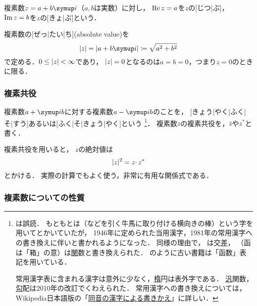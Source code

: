 \documentclass[../sotsu.tex]{subfiles}
\begin{document}
複素数$z = a + b\iu$（$a, b$は実数）に対し，
$\operatorname{Re} z = a$を$z$の[じつ|ぶ]，
$\operatorname{Im} z = b$を$z$の[きょ|ぶ]という．

複素数の[ぜっ|たい|ち](absolute value)を
\begin{equation}
    \label{eq:complex-number-abs}
    \abs{z} 
        = \abs{a + b\iu}
        \coloneq \sqrt{a^2 + b^2}
\end{equation}
で定める．$0 \leq \lvert z\rvert < \infty$であり，
$\lvert z\rvert = 0$となるのは$a = b = 0$，つまり$z = 0$のときに限る．



\subsubsection*{複素共役}

複素数$a + \iu b$に対する複素数$a - \iu b$のことを，
[きょう|やく|ふく|そ|すう]あるいは[ふく|そ|きょう|やく]という%
\footnote{\label{footnote:joyo-kanji}
    は誤読．
    もともとは（などを引く牛馬に取り付ける横向きの棒）という字を用いてとかいていたが，
    1946年に定められた当用漢字，1981年の常用漢字への書き換えに伴いと書かれるようになった．
    同様の理由で，
    は交\underline{差}，
    （函は「箱」の意）は\underline{関}数と書き換えられた．
    \cite{ito-lebesgue-1963}のように古い書籍は「函数」表記を用いている．
    
    常用漢字表に含まれる漢字は意外に少なく，\underline{楕}円は表外字である．
    \underline{汎}関数，\underline{勾}配は2010年の改訂でくわえられた．
    常用漢字への書き換えについては，
    Wikipedia日本語版の「\href{https://ja.wikipedia.org/wiki/同音の漢字による書きかえ}{同音の漢字による書きかえ}」に詳しい．
}．
複素数$z$の複素共役を，$\bar{z}$や$z^*$と書く．

複素共役を用いると，
$z$の絶対値は
\begin{equation}
    \abs{z}^2 = z \cdotp \conj{z}
\end{equation}
とかける．
実際の計算でもよく使う，非常に有用な関係式である．



\subsubsection*{複素数についての性質}
\end{document}
